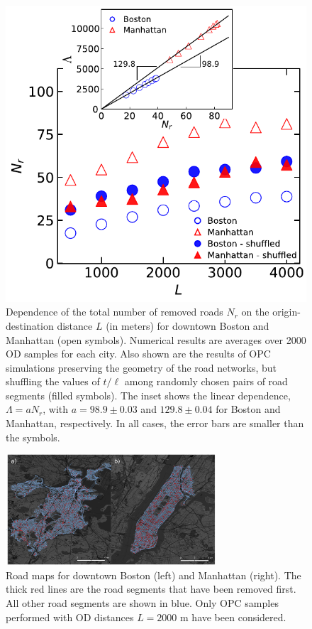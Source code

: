 \documentclass[aps,prl,twocolumn,showpacs,
superscriptaddress,floatfix, 10pt]{revtex4-1}
\begin{document}
	
\begin{figure}[ht]
	\centering
	\includegraphics[width=0.85\columnwidth]{fig3} 
    \caption{Dependence of the total number of removed roads $N_r$ on the
	origin-destination distance $L$ (in meters) for downtown Boston and
	Manhattan (open symbols). Numerical results are averages over 2000 OD
	samples for each city. Also shown  are the results of OPC simulations
	preserving the geometry of the road networks, but shuffling the values of
	$t/\ell$ among randomly chosen pairs of road segments (filled symbols). The
	inset shows the linear dependence, $\Lambda=a N_r$, with $a=98.9 \pm 0.03$
	and $129.8\pm 0.04$ for Boston and Manhattan, respectively. In all cases,
	the error bars are smaller than the symbols.~\label{fig::real.data}}
\end{figure} 


\begin{figure}[ht] 
	\centering
	\includegraphics[width=0.7\textwidth]{fig4.pdf}
	\caption{Road maps for downtown Boston (left) and Manhattan (right). The thick
	red lines are the road segments that have been removed first. All other road
	segments are shown in blue. Only OPC samples performed with OD distances
	$L=2000$ m have been considered.~\label{fig::real.data.maps}}
\end{figure} %
\end{document}
